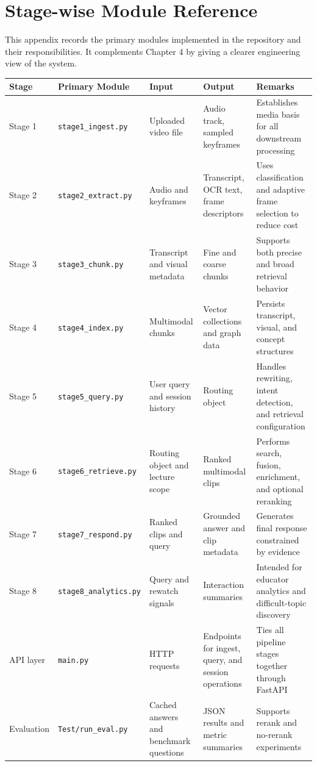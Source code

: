 \documentclass[12pt,a4paper,oneside]{report}
\begin{document}
\chapter{Stage-wise Module Reference}
This appendix records the primary modules implemented in the repository and their responsibilities. It complements Chapter 4 by giving a clearer engineering view of the system.

\begin{longtable}{p{} p{} p{} p{} p{}}
\toprule
\textbf{Stage} & \textbf{Primary Module} & \textbf{Input} & \textbf{Output} & \textbf{Remarks} \\
\midrule
Stage 1 & \texttt{stage1\_ingest.py} & Uploaded video file & Audio track, sampled keyframes & Establishes media basis for all downstream processing \\
Stage 2 & \texttt{stage2\_extract.py} & Audio and keyframes & Transcript, OCR text, frame descriptors & Uses classification and adaptive frame selection to reduce cost \\
Stage 3 & \texttt{stage3\_chunk.py} & Transcript and visual metadata & Fine and coarse chunks & Supports both precise and broad retrieval behavior \\
Stage 4 & \texttt{stage4\_index.py} & Multimodal chunks & Vector collections and graph data & Persists transcript, visual, and concept structures \\
Stage 5 & \texttt{stage5\_query.py} & User query and session history & Routing object & Handles rewriting, intent detection, and retrieval configuration \\
Stage 6 & \texttt{stage6\_retrieve.py} & Routing object and lecture scope & Ranked multimodal clips & Performs search, fusion, enrichment, and optional reranking \\
Stage 7 & \texttt{stage7\_respond.py} & Ranked clips and query & Grounded answer and clip metadata & Generates final response constrained by evidence \\
Stage 8 & \texttt{stage8\_analytics.py} & Query and rewatch signals & Interaction summaries & Intended for educator analytics and difficult-topic discovery \\
API layer & \texttt{main.py} & HTTP requests & Endpoints for ingest, query, and session operations & Ties all pipeline stages together through FastAPI \\
Evaluation & \texttt{Test/run\_eval.py} & Cached answers and benchmark questions & JSON results and metric summaries & Supports rerank and no-rerank experiments \\
\bottomrule
\end{longtable}
\end{document}
